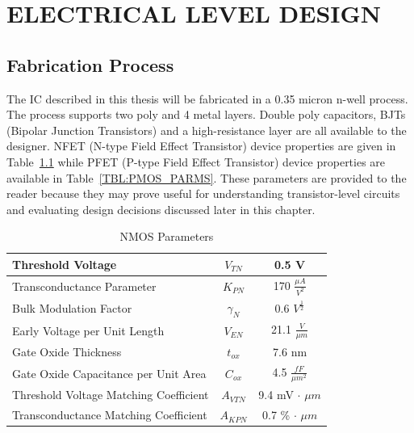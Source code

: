 \documentclass[12pt,oneside,final]{siuethesis}
\theoremstyle{definition}
\begin{document}


\chapter{ELECTRICAL LEVEL DESIGN}

\section{Fabrication Process}

The IC described in this thesis will be fabricated in a 0.35 micron n-well process.  The process supports two poly and 4 metal layers. Double poly capacitors, BJTs (Bipolar Junction Transistors) and a high-resistance layer are all available to the designer. NFET (N-type Field Effect Transistor) device properties are given in Table~\ref{TBL:NMOS_PARMS} while PFET (P-type Field Effect Transistor) device properties are available in Table~\ref{TBL:PMOS_PARMS}.  These parameters are provided to the reader because they may prove useful for understanding transistor-level circuits and evaluating design decisions discussed later in this chapter.


\begin{table} [htbp!]
\begin{center}
\begin{tabular}{| l | c | c |}
\hline 
Threshold Voltage & $V_{TN}$ & 0.5 V \\ 
\hline 
Transconductance Parameter & $K_{PN}$  &  170 $\frac{\mu A}{V^2}$ \\ 
\hline 
Bulk Modulation Factor & $\gamma_{N}$  &  0.6 $V^{\frac{1}{2}}$ \\ 
\hline 
Early Voltage per Unit Length & $V_{EN}$  &  21.1 $\frac{V}{\mu m}$ \\ 
\hline 
Gate Oxide Thickness & $t_{ox}$  &  7.6 nm \\ 
\hline 
Gate Oxide Capacitance per Unit Area & $C_{ox}$  & 4.5 $\frac{fF}{\mu m^2}$ \\ 
\hline 
Threshold Voltage Matching Coefficient & $A_{VTN}$  &  9.4 mV $\cdot$ $\mu m$ \\ 
\hline 
Transconductance Matching Coefficient & $A_{KPN}$  &  0.7 \% $\cdot$ $\mu m$ \\ 
\hline 
\end{tabular} 
\end{center}
\caption{NMOS Parameters}
\label{TBL:NMOS_PARMS}
\end{table}
\end{document}
